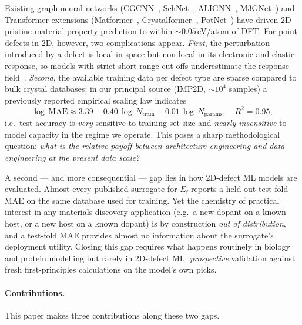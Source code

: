 \documentclass[11pt,a4paper]{article}
\begin{document}
Existing graph neural networks
(CGCNN~\cite{Xie2018CGCNN},
SchNet~\cite{Schutt2018SchNet},
ALIGNN~\cite{Choudhary2021ALIGNN},
M3GNet~\cite{Chen2022M3GNet}) and Transformer extensions
(Matformer~\cite{Yan2022Matformer},
Crystalformer~\cite{Taniai2024Crystalformer},
PotNet~\cite{Lin2023PotNet})
have driven 2D pristine-material property prediction to within
$\sim 0.05$\,eV/atom of DFT. For point defects in 2D, however, two
complications appear. \textit{First}, the perturbation introduced by
a defect is local in space but non-local in its electronic and
elastic response, so models with strict short-range cut-offs
underestimate the response field~\cite{Bertoldo2022QPOD}.
\textit{Second}, the available training data per defect type are
sparse compared to bulk crystal databases; in our principal source
(IMP2D, $\sim 10^4$ samples) a previously reported empirical scaling
law indicates~\cite{ourPaperV12}
\begin{equation}
\log\,\mathrm{MAE} \approx 3.39 - 0.40\,\log\,N_{\mathrm{train}}
- 0.01\,\log\,N_{\mathrm{params}},
\quad R^2 = 0.95,
\label{eq:scaling}
\end{equation}
i.e.\ test accuracy is \emph{very} sensitive to training-set size and
\emph{nearly insensitive} to model capacity in the regime we operate.
This poses a sharp methodological question: \emph{what is the
relative payoff between architecture engineering and data engineering
at the present data scale?}

A second --- and more consequential --- gap lies in how
2D-defect ML models are evaluated. Almost every published surrogate
for $E_{\mathrm{f}}$ reports a held-out test-fold MAE on the same
database used for training. Yet the chemistry of practical interest
in any materials-discovery application
(e.g.\ a new dopant on a known host, or a new host on a known dopant)
is by construction \emph{out of distribution}, and a test-fold MAE
provides almost no information about the surrogate's deployment
utility. Closing this gap requires what happens routinely in
biology and protein modelling but rarely in 2D-defect ML:
\emph{prospective} validation against fresh first-principles
calculations on the model's own picks.

\paragraph{Contributions.} This paper makes three contributions
along these two gaps.
\end{document}
